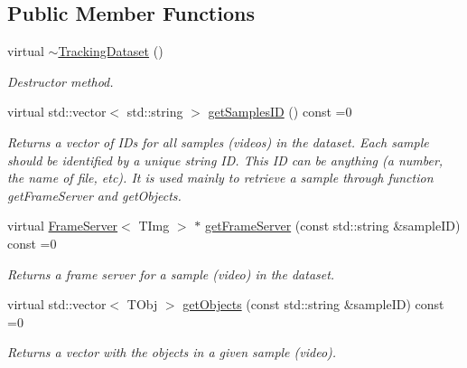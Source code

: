 \subsection*{Public Member Functions}
\begin{DoxyCompactItemize}
\item 
\hypertarget{class_vision_core_1_1_evaluation_1_1_tracking_dataset_af0ac69cd48c6f9a4f4326f3bc6f7dddc}{}virtual \hyperlink{class_vision_core_1_1_evaluation_1_1_tracking_dataset_af0ac69cd48c6f9a4f4326f3bc6f7dddc}{$\sim$\+Tracking\+Dataset} ()\label{class_vision_core_1_1_evaluation_1_1_tracking_dataset_af0ac69cd48c6f9a4f4326f3bc6f7dddc}

\begin{DoxyCompactList}\small\item\em Destructor method. \end{DoxyCompactList}\item 
\hypertarget{class_vision_core_1_1_evaluation_1_1_tracking_dataset_a4baafaba65ce3ae8e9fc8a5f74f5e0f8}{}virtual std\+::vector$<$ std\+::string $>$ \hyperlink{class_vision_core_1_1_evaluation_1_1_tracking_dataset_a4baafaba65ce3ae8e9fc8a5f74f5e0f8}{get\+Samples\+I\+D} () const  =0\label{class_vision_core_1_1_evaluation_1_1_tracking_dataset_a4baafaba65ce3ae8e9fc8a5f74f5e0f8}

\begin{DoxyCompactList}\small\item\em Returns a vector of I\+Ds for all samples (videos) in the dataset. Each sample should be identified by a unique string I\+D. This I\+D can be anything (a number, the name of file, etc). It is used mainly to retrieve a sample through function get\+Frame\+Server and get\+Objects. \end{DoxyCompactList}\item 
\hypertarget{class_vision_core_1_1_evaluation_1_1_tracking_dataset_a70a542f1492e1bde2a018641201bf1db}{}virtual \hyperlink{class_vision_core_1_1_interfaces_1_1_frame_server}{Frame\+Server}$<$ T\+Img $>$ $\ast$ \hyperlink{class_vision_core_1_1_evaluation_1_1_tracking_dataset_a70a542f1492e1bde2a018641201bf1db}{get\+Frame\+Server} (const std\+::string \&sample\+I\+D) const  =0\label{class_vision_core_1_1_evaluation_1_1_tracking_dataset_a70a542f1492e1bde2a018641201bf1db}

\begin{DoxyCompactList}\small\item\em Returns a frame server for a sample (video) in the dataset. \end{DoxyCompactList}\item 
virtual std\+::vector$<$ T\+Obj $>$ \hyperlink{class_vision_core_1_1_evaluation_1_1_tracking_dataset_a831ba73d31b15e00777727f98cf23669}{get\+Objects} (const std\+::string \&sample\+I\+D) const  =0
\begin{DoxyCompactList}\small\item\em Returns a vector with the objects in a given sample (video). \end{DoxyCompactList}\end{DoxyCompactItemize}


